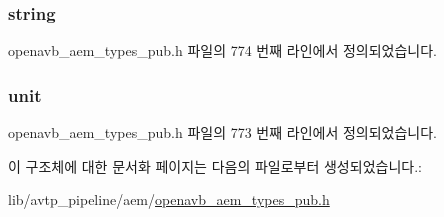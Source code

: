\subsubsection[{\texorpdfstring{string}{string}}]{ string}\hypertarget{structopenavb__aem__control__value__format__control__linear__int8__t_a1f81001cefa769cb3651172fd5ab0748}{}\label{structopenavb__aem__control__value__format__control__linear__int8__t_a1f81001cefa769cb3651172fd5ab0748}


openavb\+\_\+aem\+\_\+types\+\_\+pub.\+h 파일의 774 번째 라인에서 정의되었습니다.

\subsubsection[{\texorpdfstring{unit}{unit}}]{ unit}\hypertarget{structopenavb__aem__control__value__format__control__linear__int8__t_a0b3ff376c10369016824076deacc055e}{}\label{structopenavb__aem__control__value__format__control__linear__int8__t_a0b3ff376c10369016824076deacc055e}


openavb\+\_\+aem\+\_\+types\+\_\+pub.\+h 파일의 773 번째 라인에서 정의되었습니다.



이 구조체에 대한 문서화 페이지는 다음의 파일로부터 생성되었습니다.\+:\begin{DoxyCompactItemize}
\item 
lib/avtp\+\_\+pipeline/aem/\hyperlink{openavb__aem__types__pub_8h}{openavb\+\_\+aem\+\_\+types\+\_\+pub.\+h}\end{DoxyCompactItemize}
